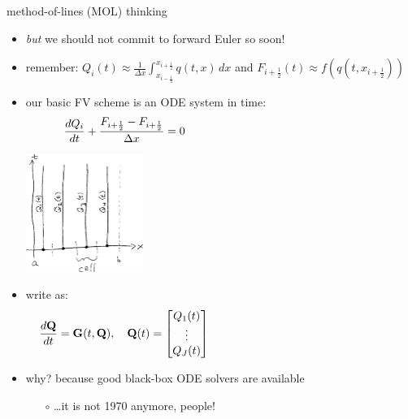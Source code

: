 \documentclass[10pt,dvipsnames,usepdftitle=false,
hyperref={pdftitle = {Finite volume methods},
    pdfauthor = {Ed Bueler}}]{beamer}
\newcommand{\bG}{\mathbf{G}}
\newcommand{\bQ}{\mathbf{Q}}
\newcommand{\xiphalf}{{x_{i+\frac{1}{2}}}}
\newcommand{\ximhalf}{{x_{i-\frac{1}{2}}}}
\newcommand{\Fiphalf}{{F_{i+\frac{1}{2}}}}
\newcommand{\ds}{\displaystyle}
\begin{document}
\begin{frame}{method-of-lines (MOL) thinking}

\begin{itemize}
\item \emph{but} we should not commit to forward Euler so soon!
\item remember: $\ds Q_i(t) \approx \frac{1}{\Delta x} \int_\ximhalf^\xiphalf q(t,x)\,dx$ and $\Fiphalf(t) \approx f\left(q(t,\xiphalf)\right)$
\item  our basic FV scheme is an ODE system in time:
    $$\frac{dQ_i}{dt} + \frac{\Fiphalf-\Fiphalf}{\Delta x} = 0 \hspace{60mm}$$

\vspace{-15mm}
\hfill \includegraphics[width=0.3\textwidth]{figs/molsketch}

\vspace{-21mm}
\item write as:
    $$\frac{d\bQ}{dt} = \bG(t,\bQ), \quad \bQ(t) = \begin{bmatrix} Q_1(t) \\ \vdots \\ Q_J(t) \end{bmatrix}   \hspace{60mm}$$

\item why? because good black-box ODE solvers are available
    \begin{itemize}
    \item[$\circ$] \dots it is not 1970 anymore, people!
    \end{itemize}
\end{itemize}
\end{frame}
\end{document}
